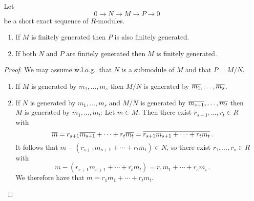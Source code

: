 \begin{lemma}
  \label{lemma: finitely generated under ses}
  Let
  \[
        0
    \to N
    \to M
    \to P
    \to 0
  \]
  be a short exact sequence of $R$-modules.
  \begin{enumerate}
    \item
      If $M$ is finitely generated then $P$ is also finitely generated.
    \item
      If both $N$ and $P$ are finitely generated then $M$ is finitely generated.
  \end{enumerate}
\end{lemma}


\begin{proof}
  We may assume w.l.o.g.\ that $N$ is a submodule of $M$ and that $P = M/N$.
  \begin{enumerate}
    \item
      If $M$ is generated by $m_1, \dotsc, m_s$ then $M/N$ is generated by $\overline{m_1}, \dotsc, \overline{m_s}$.
    \item
      If $N$ is generated by $m_1, \dotsc, m_s$ and $M/N$ is generated by $\overline{m_{s+1}}, \dotsc, \overline{m_t}$ then $M$ is generated by $m_1, \dotsc, m_t$:
      Let $m \in M$.
      Then there exist $r_{s+1}, \dotsc, r_t \in R$ with
      \[
          \overline{m}
        = r_{s+1} \overline{m_{s+1}} + \dotsb + r_t \overline{m_t}
        = \overline{r_{s+1} m_{s+1} + \dotsb + r_t m_t} \,.
      \]
      It follows that $m - (r_{s+1} m_{s+1} + \dotsb + r_t m_t) \in N$, so there exist $r_1, \dotsc, r_s \in R$ with
      \[
          m - (r_{s+1} m_{s+1} + \dotsb + r_t m_t)
        = r_1 m_1 + \dotsb + r_s m_s \,.
      \]
      We therefore have that $m = r_1 m_1 + \dotsb + r_t m_t$.
    \qedhere
  \end{enumerate}
\end{proof}


